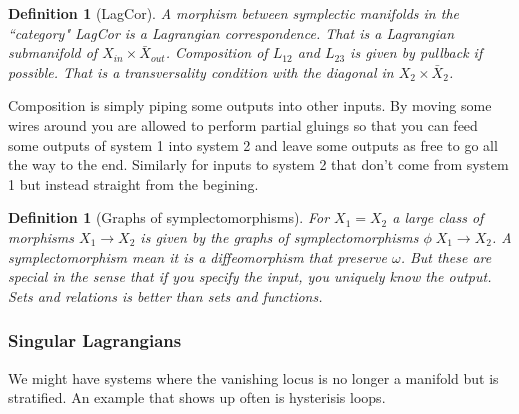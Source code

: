 \documentclass[a4paper,landscape]{article}
\theoremstyle{change}
\newtheorem{definition}[equation]{Definition}
\theoremstyle{nonumberplain}
\numberwithin{equation}{section}
\begin{document}
\begin{definition}[LagCor]
A morphism between symplectic manifolds in the ``category" LagCor is a Lagrangian correspondence. That is a Lagrangian submanifold of $X_{in} \times \bar{X}_{out}$. Composition of $L_{12}$ and $L_{23}$ is given by pullback if possible. That is a transversality condition with the diagonal in $X_2 \times \bar{X}_2$.


\end{definition}

Composition is simply piping some outputs into other inputs. By moving some wires around you are allowed to perform partial gluings so that you can feed some outputs of system 1 into system 2 and leave some outputs as free to go all the way to the end. Similarly for inputs to system 2 that don't come from system 1 but instead straight from the begining.

\begin{definition}[Graphs of symplectomorphisms]
For $X_1 = X_2$ a large class of morphisms $X_1 \to X_2$ is given by the graphs of symplectomorphisms $\phi \; X_1 \to X_2$. A symplectomorphism mean it is a diffeomorphism that preserve $\omega$. But these are special in the sense that if you specify the input, you uniquely know the output. Sets and relations is better than sets and functions.
\end{definition}

\subsubsection{Singular Lagrangians}

We might have systems where the vanishing locus is no longer a manifold but is stratified. An example that shows up often is hysterisis loops.
\end{document}
